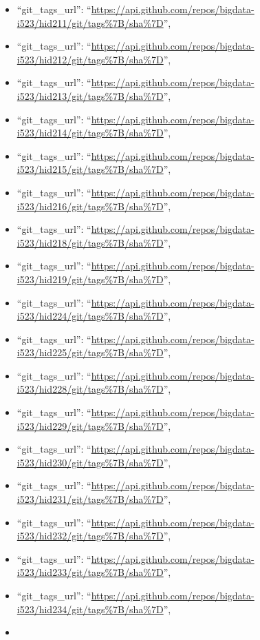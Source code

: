 \begin{itemize}
\item
  ``git\_tags\_url'':
  ``\url{https://api.github.com/repos/bigdata-i523/hid211/git/tags\%7B/sha\%7D}'',
\item
  ``git\_tags\_url'':
  ``\url{https://api.github.com/repos/bigdata-i523/hid212/git/tags\%7B/sha\%7D}'',
\item
  ``git\_tags\_url'':
  ``\url{https://api.github.com/repos/bigdata-i523/hid213/git/tags\%7B/sha\%7D}'',
\item
  ``git\_tags\_url'':
  ``\url{https://api.github.com/repos/bigdata-i523/hid214/git/tags\%7B/sha\%7D}'',
\item
  ``git\_tags\_url'':
  ``\url{https://api.github.com/repos/bigdata-i523/hid215/git/tags\%7B/sha\%7D}'',
\item
  ``git\_tags\_url'':
  ``\url{https://api.github.com/repos/bigdata-i523/hid216/git/tags\%7B/sha\%7D}'',
\item
  ``git\_tags\_url'':
  ``\url{https://api.github.com/repos/bigdata-i523/hid218/git/tags\%7B/sha\%7D}'',
\item
  ``git\_tags\_url'':
  ``\url{https://api.github.com/repos/bigdata-i523/hid219/git/tags\%7B/sha\%7D}'',
\item
  ``git\_tags\_url'':
  ``\url{https://api.github.com/repos/bigdata-i523/hid224/git/tags\%7B/sha\%7D}'',
\item
  ``git\_tags\_url'':
  ``\url{https://api.github.com/repos/bigdata-i523/hid225/git/tags\%7B/sha\%7D}'',
\item
  ``git\_tags\_url'':
  ``\url{https://api.github.com/repos/bigdata-i523/hid228/git/tags\%7B/sha\%7D}'',
\item
  ``git\_tags\_url'':
  ``\url{https://api.github.com/repos/bigdata-i523/hid229/git/tags\%7B/sha\%7D}'',
\item
  ``git\_tags\_url'':
  ``\url{https://api.github.com/repos/bigdata-i523/hid230/git/tags\%7B/sha\%7D}'',
\item
  ``git\_tags\_url'':
  ``\url{https://api.github.com/repos/bigdata-i523/hid231/git/tags\%7B/sha\%7D}'',
\item
  ``git\_tags\_url'':
  ``\url{https://api.github.com/repos/bigdata-i523/hid232/git/tags\%7B/sha\%7D}'',
\item
  ``git\_tags\_url'':
  ``\url{https://api.github.com/repos/bigdata-i523/hid233/git/tags\%7B/sha\%7D}'',
\item
  ``git\_tags\_url'':
  ``\url{https://api.github.com/repos/bigdata-i523/hid234/git/tags\%7B/sha\%7D}'',
\item

\end{itemize}
